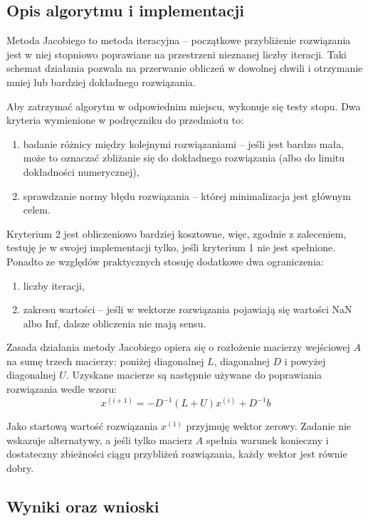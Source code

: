 \documentclass[12pt]{article}
\begin{document}
\subsection{Opis algorytmu i implementacji}
Metoda Jacobiego to metoda iteracyjna -- początkowe przybliżenie rozwiązania jest w niej stopniowo poprawiane na przestrzeni nieznanej liczby iteracji. Taki schemat działania pozwala na przerwanie obliczeń w dowolnej chwili i otrzymanie mniej lub bardziej dokładnego rozwiązania.

Aby zatrzymać algorytm w odpowiednim miejscu, wykonuje się testy stopu. Dwa kryteria wymienione w podręczniku do przedmiotu to:
\begin{enumerate}
\item badanie różnicy między kolejnymi rozwiązaniami -- jeśli jest bardzo mała, może to oznaczać zbliżanie się do dokładnego rozwiązania (albo do limitu dokładności numerycznej), 
\item sprawdzanie normy błędu rozwiązania -- której minimalizacja jest głównym celem.
\end{enumerate}
Kryterium 2 jest obliczeniowo bardziej kosztowne, więc, zgodnie z zaleceniem, testuję je w swojej implementacji tylko, jeśli kryterium 1 nie jest spełnione. \\
Ponadto ze względów praktycznych stosuję dodatkowe dwa ograniczenia:
\begin{enumerate}[resume]
\item liczby iteracji,
\item zakresu wartości -- jeśli w wektorze rozwiązania pojawiają się wartości NaN albo Inf, dalsze obliczenia nie mają sensu.
\end{enumerate}

Zasada działania metody Jacobiego opiera się o rozłożenie macierzy wejściowej \(A\) na sumę trzech macierzy: poniżej diagonalnej \(L\), diagonalnej \(D\) i powyżej diagonalnej \(U\). Uzyskane macierze są następnie używane do poprawiania rozwiązania wedle wzoru:
\[ x^{(i+1)} = -D^{-1}(L+U)x^{(i)} + D^{-1}b \]

Jako startową wartość rozwiązania \(x^{(1)}\) przyjmuję wektor zerowy. Zadanie nie wskazuje alternatywy, a jeśli tylko macierz \(A\) spełnia warunek konieczny i dostateczny zbieżności ciągu przybliżeń rozwiązania, każdy wektor jest równie dobry.

\subsection{Wyniki oraz wnioski}
\end{document}
